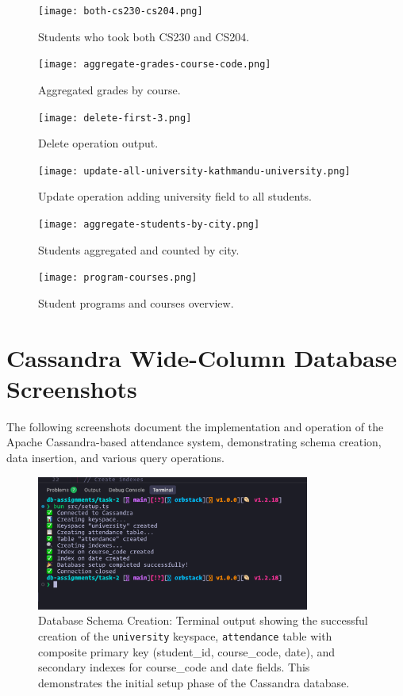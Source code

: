 \begin{figure}[H]
\centering
\texttt{[image: both-cs230-cs204.png]}
\caption{Students who took both CS230 and CS204.}
\label{fig:both-cs230-cs204}
\end{figure}

\begin{figure}[H]
\centering
\texttt{[image: aggregate-grades-course-code.png]}
\caption{Aggregated grades by course.}
\label{fig:aggregate-grades-course-code}
\end{figure}

\begin{figure}[H]
\centering
\texttt{[image: delete-first-3.png]}
\caption{Delete operation output.}
\label{fig:delete-first-3}
\end{figure}

\begin{figure}[H]
  \centering
  \texttt{[image: update-all-university-kathmandu-university.png]}
  \caption{Update operation adding university field to all students.}
  \label{fig:update-university}
\end{figure}

\begin{figure}[H]
  \centering
  \texttt{[image: aggregate-students-by-city.png]}
  \caption{Students aggregated and counted by city.}
  \label{fig:aggregate-students-city}
\end{figure}

\begin{figure}[H]
\centering
\texttt{[image: program-courses.png]}
\caption{Student programs and courses overview.}
\label{fig:program-courses}
\end{figure}

\section{Cassandra Wide-Column Database Screenshots}

The following screenshots document the implementation and operation of the Apache Cassandra-based attendance system, demonstrating schema creation, data insertion, and various query operations.

\begin{figure}[H]
  \centering
  \includegraphics[width=0.8\textwidth]{task-2/screenshots/create-database-and-tables.png}
  \caption{Database Schema Creation: Terminal output showing the successful creation of the \texttt{university} keyspace, \texttt{attendance} table with composite primary key (student\_id, course\_code, date), and secondary indexes for course\_code and date fields. This demonstrates the initial setup phase of the Cassandra database.}
  \label{fig:task2-create-database}
\end{figure}

